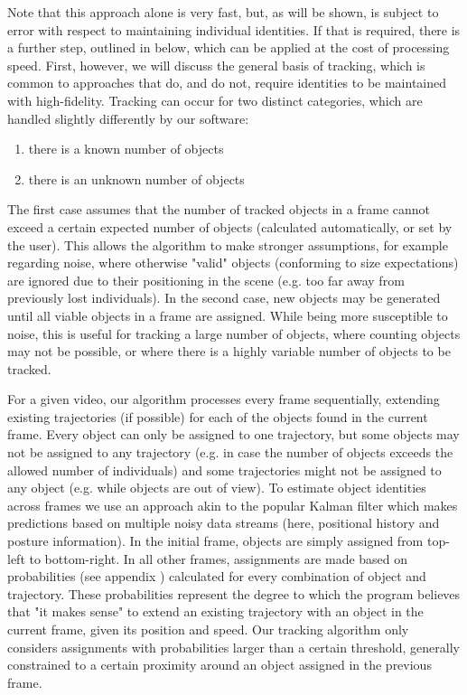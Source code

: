 \documentclass[9pt,lineno]{elife}
\newcommand{\changemade}[1]{#1}
\begin{document}
Note that this approach alone is very fast, but, as will be shown, is subject to error with respect to maintaining individual identities. If that is required, there is a further step, outlined in  below, which can be applied at the cost of processing speed. First, however, we will discuss the general basis of tracking, which is common to approaches that do, and do not, require identities to be maintained with high-fidelity. Tracking can occur for two distinct categories, which are handled slightly differently by our software:
\begin{enumerate}
  \item there is a known number of objects
  \item there is an unknown number of objects
\end{enumerate}

The first case assumes that the number of tracked objects in a frame cannot exceed a certain expected number of objects (\changemade{calculated} automatically\changemade{,} or set by the user). This allows the algorithm to make stronger assumptions, for example regarding noise, where otherwise "valid" objects (conforming to size expectations) are ignored due to their positioning in the scene (e.g. too far away from previously lost individuals). In the second case, new objects may be generated until all viable objects in a frame are assigned. While being more susceptible to noise, this is useful for tracking a large number of objects, where counting objects may not be possible, or where there is a highly variable number of objects to be tracked.

For a given video, our algorithm processes every frame sequentially, extending existing trajectories (if possible) for each of the objects found in the current frame. Every object can only be assigned to one trajectory, but some objects may not be assigned to any trajectory (e.g. in case the number of objects exceeds the allowed number of individuals) and some trajectories might not be assigned to any object (e.g. while objects are out of view). To estimate object identities across frames we use an approach akin to the popular Kalman filter \citep{kalman1960new} which makes predictions based on multiple noisy data streams (here, positional history and posture information).  
In the initial frame, objects are simply assigned from top-left to bottom-right. In all other frames, assignments are made based on probabilities (see appendix ) calculated for every combination of object and trajectory. These probabilities represent the degree to which the program believes that "it makes sense" to extend an existing trajectory with an object in the current frame, given its position and speed. Our tracking algorithm only considers assignments with probabilities larger than a certain threshold, generally constrained to a certain proximity around an object assigned in the previous frame. 
\end{document}
